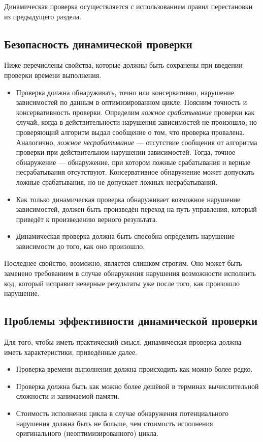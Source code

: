 Динамическая проверка осуществляется с использованием правил перестановки из предыдущего раздела.

\subsection{Безопасность динамической проверки}

Ниже перечислены свойства, которые должны быть сохранены при введении проверки времени выполнения.

\begin{itemize}
	\item Проверка должна обнаруживать, точно или консервативно, нарушение зависимостей по данным в оптимизированном цикле. Поясним точность и консервативность проверки. Определим \emph{ложное  срабатывание} проверки как случай, когда в действительности нарушения зависимостей не произошло, но проверяющий алгоритм выдал сообщение о том, что проверка провалена. Аналогично, \emph{ложное  несрабатывание} --- отсутствие сообщения от алгоритма проверки при действительном нарушении зависимостей. Тогда, точное обнаружение --- обнаружение, при котором  ложные срабатывания и верные несрабатывания отсутствуют. Консервативное обнаружение может допускать ложные  срабатывания, но не допускает ложных несрабатываний.
	\item Как только динамическая проверка обнаруживает возможное нарушение зависимостей, должен быть произведён переход на путь управления, который приведёт к произведению верного результата.
	\item Динамическая проверка должна быть способна определить нарушение зависимости до того, как оно произошло.
\end{itemize}

Последнее свойство, возможно, является слишком строгим. Оно может быть заменено требованием в случае обнаружения нарушения возможности исполнить код, который исправит неверные результаты уже после того, как произошло нарушение.

\subsection{Проблемы эффективности динамической проверки}

Для того, чтобы иметь практический смысл, динамическая проверка должна иметь характеристики, приведённые далее.

\begin{itemize}
	\item Проверка времени выполнения должна происходить как можно более редко.
	\item Проверка должна быть как можно более дешёвой в терминах вычислительной сложности и занимаемой памяти.
	\item Стоимость исполнения цикла в случае обнаружения потенциального нарушения должна быть не больше, чем стоимость исполнения оригинального (неоптимизированного) цикла.
\end{itemize}


